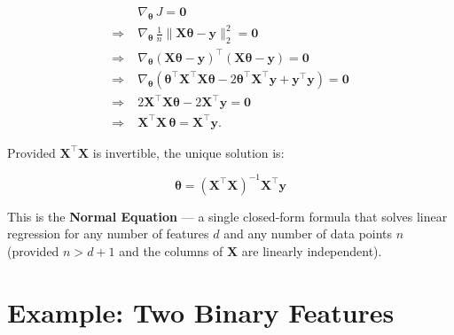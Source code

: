 \documentclass[12pt, a4paper]{article}
\newif\ifstudentmode
\newcommand{\sol}[2][6cm]{%
  \ifstudentmode
    \underline{\hspace{#1}}%
  \else
    {#2}%
  \fi
}
\theoremstyle{definition}
\newcommand{\bth}{\boldsymbol{\theta}}
\newcommand{\bX}{\mathbf{X}}
\newcommand{\by}{\mathbf{y}}
\begin{document}
\begin{align*}
  &\nabla_{\bth}\, J = \mathbf{0} \\[6pt]
  \Rightarrow\;&
    \nabla_{\bth}\,\frac{1}{n}\|\bX\bth - \by\|_2^2 = \mathbf{0} \\[6pt]
  \Rightarrow\;&
    \nabla_{\bth}
    \left(\bX\bth - \by\right)^{\!\top}
    \left(\bX\bth - \by\right) = \mathbf{0} \\[6pt]
  \Rightarrow\;&
    \nabla_{\bth}\!\left(
      \sol[9cm]{\bth^{\top}\bX^{\top}\bX\bth
      - 2\bth^{\top}\bX^{\top}\by
      + \by^{\top}\by}
    \right) = \mathbf{0} \\[6pt]
  \Rightarrow\;&
    \sol[7cm]{2\bX^{\top}\bX\bth - 2\bX^{\top}\by} = \mathbf{0} \\[6pt]
  \Rightarrow\;&
    \bX^{\top}\bX\,\bth = \bX^{\top}\by.
\end{align*}

Provided $\bX^{\top}\bX$ is invertible, the unique solution is:

\begin{resultbox}
\[
  \bth = \sol[8cm]{\left(\bX^{\top}\bX\right)^{-1}\bX^{\top}\by}
\]
\end{resultbox}

This is the \textbf{Normal Equation} — a single closed-form formula that solves
linear regression for any number of features $d$ and any number of data points
$n$ (provided $n > d+1$ and the columns of $\bX$ are linearly independent).

\section{Example: Two Binary Features}
\end{document}
